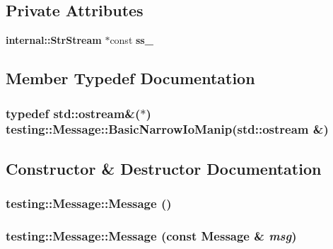 \subsection*{Private Attributes}
\begin{CompactItemize}
\item 
{\bf internal::StrStream} $\ast$const {\bf ss\_\-}
\end{CompactItemize}


\subsection{Member Typedef Documentation}
\subsubsection{\setlength{\rightskip}{0pt plus 5cm}typedef std::ostream\&($\ast$) {\bf testing::Message::BasicNarrowIoManip}(std::ostream \&)\hspace{0.3cm}{\tt  [private]}}\label{classtesting_1_1Message_d6592b46e80a587f99786b9a5a30eb17}




\subsection{Constructor \& Destructor Documentation}
\subsubsection{\setlength{\rightskip}{0pt plus 5cm}testing::Message::Message ()\hspace{0.3cm}{\tt  [inline]}}\label{classtesting_1_1Message_2d0cd79d4b67c118d558c4e5a435bc62}


\subsubsection{\setlength{\rightskip}{0pt plus 5cm}testing::Message::Message (const {\bf Message} \& {\em msg})\hspace{0.3cm}{\tt  [inline]}}\label{classtesting_1_1Message_7785c2b6d507a324c48336929b2faf3d}


